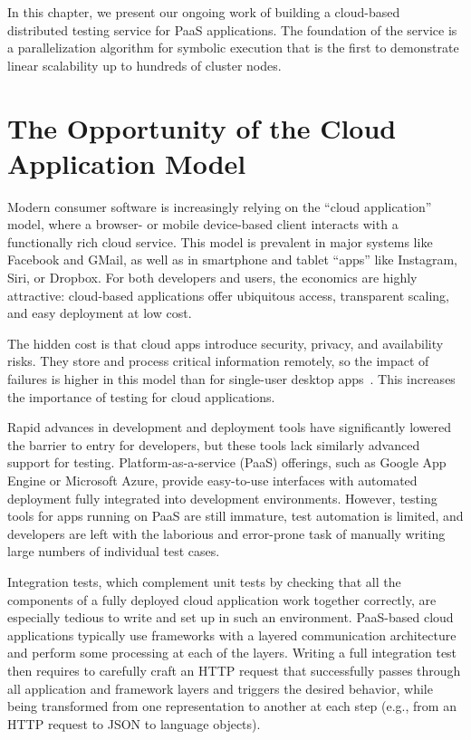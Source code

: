 In this chapter, we present our ongoing work of building a cloud-based distributed testing service for PaaS applications.  The foundation of the service is a parallelization algorithm for symbolic execution that is the first to demonstrate linear scalability up to hundreds of cluster nodes.

\section{The Opportunity of the Cloud Application Model}

Modern consumer software is increasingly relying on the ``cloud application'' model, where a browser- or mobile device-based client interacts with a functionally rich cloud service.
%
This model is prevalent in major systems like Facebook and GMail, as well as in smartphone and tablet ``apps'' like Instagram, Siri, or Dropbox.
%
For both developers and users, the economics are highly \mbox{attractive:} cloud-based applications offer ubiquitous access, transparent scaling, and easy deployment at low cost.

The hidden cost is that cloud apps introduce security, privacy, and availability risks. They store and process critical information remotely, so the impact of failures is higher in this model than for single-user desktop apps~\cite{web-failures-tr}.  This increases the importance of testing for cloud applications.

Rapid advances in development and deployment tools have significantly lowered the barrier to entry for developers, but these tools lack similarly advanced support for testing. Platform-as-a-service (PaaS) offerings, such as Google App Engine or Microsoft Azure, provide easy-to-use interfaces with automated deployment fully integrated into development environments.
%
However, testing tools for apps running on PaaS are still immature, test automation is limited, and developers are left with the laborious and error-prone task of manually writing large numbers of individual test cases.

Integration tests, which complement unit tests by checking that all the components of a fully deployed cloud application work together correctly, are especially tedious to write and set up in such an environment.
%
PaaS-based cloud applications typically use frameworks with a layered communication architecture and perform some processing at each of the layers. Writing a full integration test then requires to carefully craft an HTTP request that successfully passes through all application and framework layers and triggers the desired behavior, while being transformed from one representation to another at each step (e.g., from an HTTP request to JSON to language objects).

